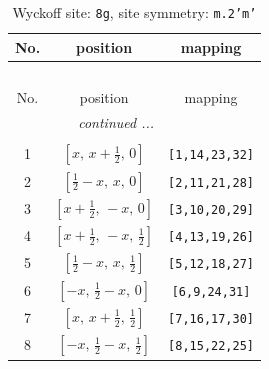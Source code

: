 \documentclass[fleqn,8pt]{jsarticle}
\begin{document}
\begin{longtable}{ccc}
\caption{Wyckoff site: {\tt 8g}, site symmetry: {\tt m.2'm'}}
 \\
 \hline \hline
No. & position & mapping \\ \hline \endfirsthead

\multicolumn{2}{l}{\tablename\ \thetable{}} \\
 \hline \hline
No. & position & mapping \\ \hline \endhead

 \hline \hline
\multicolumn{2}{r}{\footnotesize\it continued ...} \\ \endfoot

 \hline \hline
\multicolumn{2}{r}{} \\ \endlastfoot

1 & $\left[ x,\, x + \frac{1}{2},\, 0 \right]$ & {\tt [1,14,23,32]} \\ \hline
2 & $\left[ \frac{1}{2} - x,\, x,\, 0 \right]$ & {\tt [2,11,21,28]} \\ \hline
3 & $\left[ x + \frac{1}{2},\, - x,\, 0 \right]$ & {\tt [3,10,20,29]} \\ \hline
4 & $\left[ x + \frac{1}{2},\, - x,\, \frac{1}{2} \right]$ & {\tt [4,13,19,26]} \\ \hline
5 & $\left[ \frac{1}{2} - x,\, x,\, \frac{1}{2} \right]$ & {\tt [5,12,18,27]} \\ \hline
6 & $\left[ - x,\, \frac{1}{2} - x,\, 0 \right]$ & {\tt [6,9,24,31]} \\ \hline
7 & $\left[ x,\, x + \frac{1}{2},\, \frac{1}{2} \right]$ & {\tt [7,16,17,30]} \\ \hline
8 & $\left[ - x,\, \frac{1}{2} - x,\, \frac{1}{2} \right]$ & {\tt [8,15,22,25]} \\
\end{longtable}
\renewcommand{\arraystretch}{1.2}
\end{document}
